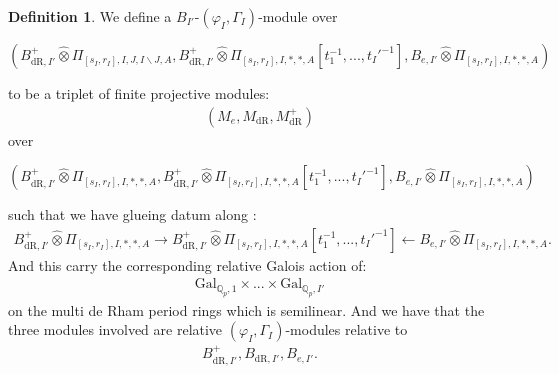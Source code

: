 \documentclass[12pt]{amsart}
\theoremstyle{definition}
\newtheorem{definition}[theorem]{Definition}
\numberwithin{equation}{section}
\begin{document}
\begin{definition} 
We define a $B_{I'}$-$(\varphi_I,\Gamma_I)$-module over
\begin{center}
$(B^+_{\mathrm{dR},I'}	\widehat{\otimes}\Pi_{[s_I,r_I],I,J,I\backslash J,A},B^+_{\mathrm{dR},I'}	\widehat{\otimes}\Pi_{[s_I,r_I],I,*,*,A}[t_1^{-1},...,t_I'^{-1}],B_{e,I'}	\widehat{\otimes}\Pi_{[s_I,r_I],I,*,*,A})$	
\end{center}
to be a triplet of finite projective modules:
\begin{align}
(M_e,M_{\mathrm{dR}},M^+_{\mathrm{dR}})	
\end{align}
over 
\begin{center}
$(B^+_{\mathrm{dR},I'}	\widehat{\otimes}\Pi_{[s_I,r_I],I,*,*,A},B^+_{\mathrm{dR},I'}	\widehat{\otimes}\Pi_{[s_I,r_I],I,*,*,A}[t_1^{-1},...,t_I'^{-1}],B_{e,I'}	\widehat{\otimes}\Pi_{[s_I,r_I],I,*,*,A})$	
\end{center}
such that we have glueing datum along :
\begin{align}
B^+_{\mathrm{dR},I'}	\widehat{\otimes}\Pi_{[s_I,r_I],I,*,*,A}\rightarrow B^+_{\mathrm{dR},I'}	\widehat{\otimes}\Pi_{[s_I,r_I],I,*,*,A}[t_1^{-1},...,t_I'^{-1}] \leftarrow B_{e,I'}	\widehat{\otimes}\Pi_{[s_I,r_I],I,*,*,A}.	
\end{align}
And this carry the corresponding relative Galois action of:
\begin{align}
\mathrm{Gal}_{\mathbb{Q}_p,1}\times...\times \mathrm{Gal}_{\mathbb{Q}_p,I'}	
\end{align}
on the multi de Rham period rings which is semilinear. And we have that the three modules involved are relative $(\varphi_I,\Gamma_I)$-modules relative to
\begin{align}
B^+_{\mathrm{dR},I'},B_{\mathrm{dR},I'},B_{e,I'}.	
\end{align}

	
\end{definition}
\end{document}
